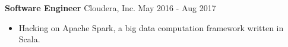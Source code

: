 \textbf{Software Engineer} Cloudera, Inc. \hfill May 2016 - Aug 2017

\begin{itemize} \itemsep -2pt

\item Hacking on Apache Spark, a big data computation framework written in Scala.


\end{itemize}

